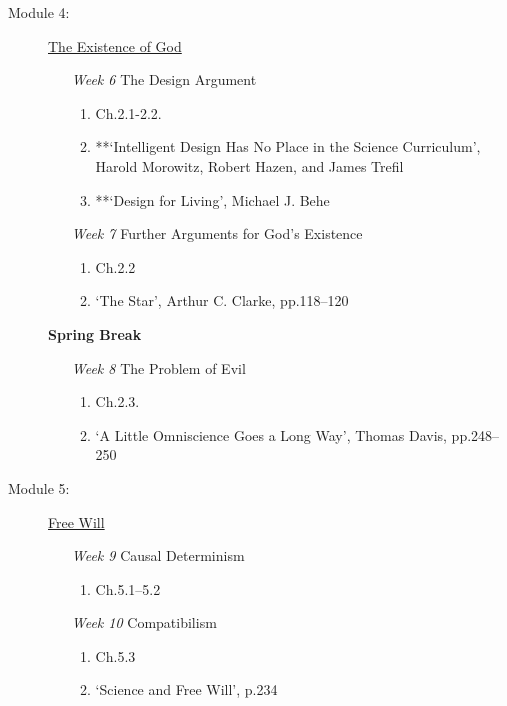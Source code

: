 \documentclass[article,oneside]{memoir}
\begin{document}
\begin{description}
\item[Module 4: ] \href{http://scoconno.github.io/Teaching/Examined/God/}{The Existence of God}

\begin{enumerate}

\item[\textit{Week 6}] The Design Argument
\begin{enumerate}
\item Ch.2.1-2.2. 
\item **`Intelligent Design Has No Place in the Science Curriculum', Harold Morowitz, Robert Hazen, and James Trefil
 \item **`Design for Living', Michael J. Behe
 \end{enumerate}
 
\item[\textit{Week 7}] Further Arguments for God's Existence
\begin{enumerate}
\item Ch.2.2
\item `The Star', Arthur C. Clarke, pp.118--120
\end{enumerate}
\end{enumerate}
\item[ ] \textbf{Spring Break}

\begin{enumerate}
\item[\textit{Week 8}] The Problem of Evil 
\begin{enumerate}
\item Ch.2.3.
\item `A Little Omniscience Goes a Long Way', Thomas Davis, pp.248--250
\end{enumerate}
\end{enumerate}


\item[Module 5:] \href{http://scoconno.github.io/Teaching/Examined/FreeWill/}{Free Will}

\begin{enumerate}

\item[\textit{Week 9}] Causal Determinism
\begin{enumerate}
\item Ch.5.1--5.2
\end{enumerate}

\item[\textit{Week 10}] Compatibilism
\begin{enumerate}
\item Ch.5.3
\item `Science and Free Will', p.234
\end{enumerate}
\end{enumerate}


\end{description}
\end{document}
